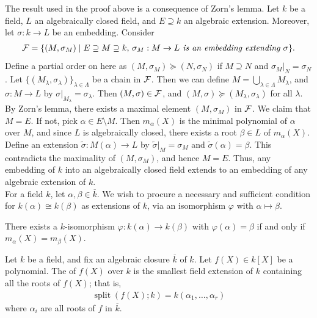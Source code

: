 The result used in the proof above is a consequence of Zorn's lemma. Let $k$ be a field, $L$ an algebraically closed field, and $E \supseteq k$ an algebraic extension. Moreover, let $\sigma:k \to L$ be an embedding. Consider
\begin{align}
    \cF = \{(M,\sigma_{M}) \mid E \supseteq M \supseteq k, \, \sigma_{M}:M \to L \eax{ is an embedding extending } \sigma\}.
\end{align}
Define a partial order on here as $(M,\sigma_{M}) \succeq (N,\sigma_{N})$ if $M \supseteq N$ and $\sigma_{M}|_{N} = \sigma_{N}$. Let $\{(M_{\lambda},\sigma_{\lambda})\}_{\lambda \in \Lambda}$ be a chain in $\mathcal{F}$. Then we can define $M = \bigcup_{\lambda \in \Lambda} M_{\lambda}$, and $\sigma:M \to L$ by $\sigma|_{M_{\lambda}} = \sigma_{\lambda}$. Then $(M,\sigma) \in \mathcal{F}$, and $(M,\sigma) \succeq (M_{\lambda},\sigma_{\lambda})$ for all $\lambda$. By Zorn's lemma, there exists a maximal element $(M,\sigma_{M})$ in $\mathcal{F}$. We claim that $M = E$. If not, pick $\alpha \in E \setminus M$. Then $m_{\alpha}(X)$ is the minimal polynomial of $\alpha$ over $M$, and since $L$ is algebraically closed, there exists a root $\beta \in L$ of $m_{\alpha}(X)$. Define an extension $\tilde{\sigma}:M(\alpha) \to L$ by $\tilde{\sigma}|_{M} = \sigma_{M}$ and $\tilde{\sigma}(\alpha) = \beta$. This contradicts the maximality of $(M,\sigma_{M})$, and hence $M = E$. Thus, any embedding of $k$ into an algebraically closed field extends to an embedding of any algebraic extension of $k$.
\\

For a field $k$, let $\alpha,\beta \in \overline{k}$. We wish to procure a necessary and sufficient condition for $k(\alpha) \cong k(\beta)$ as extensions of $k$, via an isomorphism $\varphi$ with $\alpha \mapsto \beta$.

\begin{lemma}
    There exists a $k$-isomorphism $\varphi:k(\alpha) \to k(\beta)$ with $\varphi(\alpha) = \beta$ if and only if $m_{\alpha}(X) = m_{\beta}(X)$.
\end{lemma}

\begin{definition}
    Let $k$ be a field, and fix an algebraic closure $\overline{k}$ of $k$. Let $f(X) \in k[X]$ be a polynomial. The  of $f(X)$ over $k$ is the smallest field extension of $k$ containing all the roots of $f(X)$; that is,
    \begin{align}
        \operatorname{split}(f(X);k) = k(\alpha_{1},\ldots,\alpha_{r})
    \end{align}
    where $\alpha_{i}$ are all roots of $f$ in $\overline{k}$.
\end{definition}

